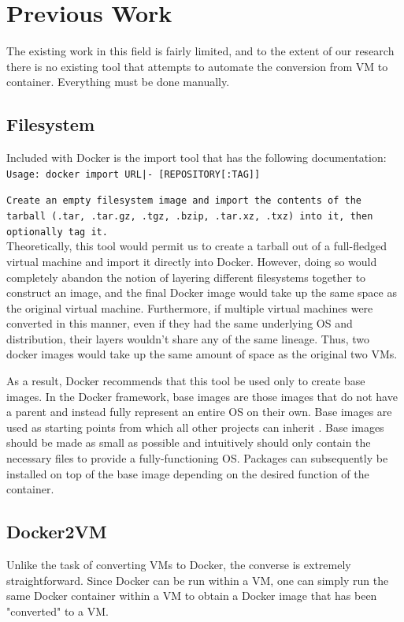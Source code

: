 \documentclass[\myfontsize, letterpaper]{article}
\begin{document}
\section{Previous Work}

The existing work in this field is fairly limited, and to the extent of our research there is no existing tool that attempts to automate the conversion from VM to container. Everything must be done manually.


\subsection{Filesystem}

Included with Docker is the import tool that has the following documentation:\\

\texttt{Usage: docker import URL|- [REPOSITORY[:TAG]]}

\texttt{Create an empty filesystem image and import the contents of the tarball (.tar, .tar.gz, .tgz, .bzip, .tar.xz, .txz) into it, then optionally tag it.} \\

Theoretically, this tool would permit us to create a tarball out of a full-fledged virtual machine and import it directly into Docker. However, doing so would completely abandon the notion of layering different filesystems together to construct an image, and the final Docker image would take up the same space as the original virtual machine. Furthermore, if multiple virtual machines were converted in this manner, even if they had the same underlying OS and distribution, their layers wouldn't share any of the same lineage. Thus, two docker images would take up the same amount of space as the original two VMs. 

As a result, Docker recommends that this tool be used only to create base images. In the Docker framework, base images are those images that do not have a parent and instead fully represent an entire OS on their own. Base images are used as starting points from which all other projects can inherit \cite{baseimage}. Base images should be made as small as possible and intuitively should only contain the necessary files to provide a fully-functioning OS. Packages can subsequently be installed on top of the base image depending on the desired function of the container. 

\subsection{Docker2VM}
Unlike the task of converting VMs to Docker, the converse is extremely straightforward. Since Docker can be run within a VM, one can simply run the same Docker container within a VM to obtain a Docker image that has been "converted" to a VM.
\end{document}
